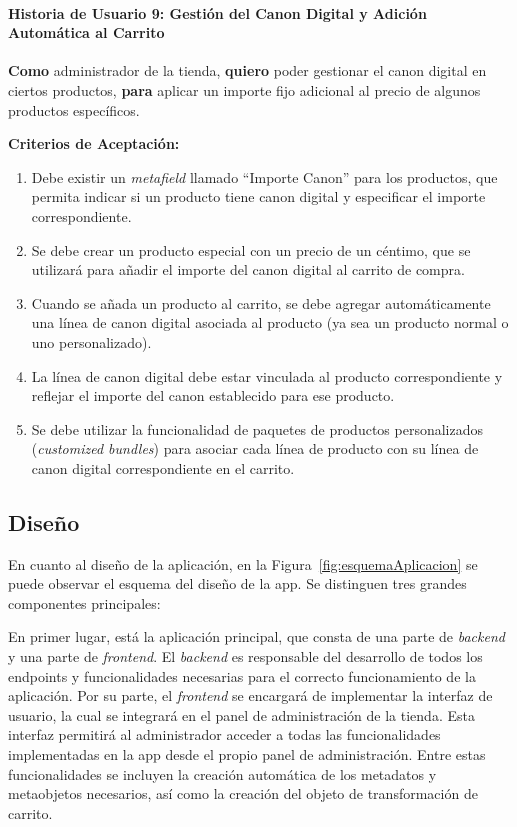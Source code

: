 \documentclass[12pt]{article}
\newcommand{\subsubsubsection}[1]{\paragraph{#1}}
\begin{document}
\subsubsubsection{Historia de Usuario 9: Gestión del Canon Digital y Adición Automática al Carrito}\label{sec:historia9}

\textbf{Como} administrador de la tienda,
\textbf{quiero} poder gestionar el canon digital en ciertos productos,
\textbf{para} aplicar un importe fijo adicional al precio de algunos productos específicos.

\vspace{0.5cm}
\textbf{Criterios de Aceptación:}
\begin{enumerate}[label=\arabic*.]
    \item Debe existir un \textit{metafield} llamado ``Importe Canon'' para los productos, que permita indicar si un producto tiene canon digital y especificar el importe correspondiente.
    \item Se debe crear un producto especial con un precio de un céntimo, que se utilizará para añadir el importe del canon digital al carrito de compra.
    \item Cuando se añada un producto al carrito, se debe agregar automáticamente una línea de canon digital asociada al producto (ya sea un producto normal o uno personalizado).
    \item La línea de canon digital debe estar vinculada al producto correspondiente y reflejar el importe del canon establecido para ese producto.
    \item Se debe utilizar la funcionalidad de paquetes de productos personalizados (\textit{customized bundles}) para asociar cada línea de producto con su línea de canon digital correspondiente en el carrito.
\end{enumerate}

\clearpage
\subsection{Diseño}

En cuanto al diseño de la aplicación, en la Figura~\ref{fig:esquemaAplicacion} se puede observar el esquema del diseño de la app.
Se distinguen tres grandes componentes principales:

En primer lugar, está la aplicación principal, que consta de una parte de \textit{backend} y una parte de \textit{frontend}.
El \textit{backend} es responsable del desarrollo de todos los endpoints y funcionalidades necesarias para el correcto 
funcionamiento de la aplicación. Por su parte, el \textit{frontend} se encargará de implementar la interfaz de usuario, 
la cual se integrará en el panel de administración de la tienda. Esta interfaz permitirá al administrador acceder 
a todas las funcionalidades implementadas en la app desde el propio panel de administración. Entre estas funcionalidades 
se incluyen la creación automática de los metadatos y metaobjetos necesarios, así como la creación del objeto de transformación de carrito.
\end{document}

